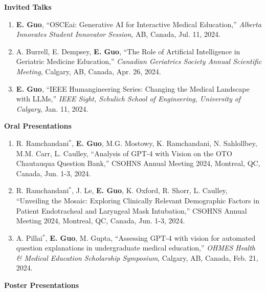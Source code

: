 \documentclass{article}
\begin{document}
\textbf{Invited Talks} \vspace{.5em}

\begin{enumerate}
    \item \textbf{E. Guo}, ``OSCEai: Generative AI for Interactive Medical Education,'' \textit{Alberta Innovates Student Innovator Session}, AB, Canada, Jul. 11, 2024.
    \item A. Burrell, E. Dempsey, \textbf{E. Guo}, ``The Role of Artificial Intelligence in Geriatric Medicine Education,'' \textit{Canadian Geriatrics Society Annual Scientific Meeting}, Calgary, AB, Canada, Apr. 26, 2024.
    \item \textbf{E. Guo}, ``IEEE Humangineering Series: Changing the Medical Landscape with LLMs,'' \textit{IEEE Sight, Schulich School of Engineering, University of Calgary}, Jan. 11, 2024.
\end{enumerate} \vspace{1em}

\textbf{Oral Presentations} \vspace{.5em}

\begin{enumerate}
    \item R. Ramchandani$^*$, \textbf{E. Guo}, M.G. Mostowy, K. Ramchandani, N. Sahlollbey, M.M. Carr, L. Caulley, ``Analysis of GPT-4 with Vision on the OTO Chautauqua Question Bank,'' CSOHNS Annual Meeting 2024, Montreal, QC, Canada, Jun. 1-3, 2024.
    \item R. Ramchandani$^*$, J. Le, \textbf{E. Guo}, K. Oxford, R. Shorr, L. Caulley, ``Unveiling the Mosaic: Exploring Clinically Relevant Demographic Factors in Patient Endotracheal and Laryngeal Mask Intubation,'' CSOHNS Annual Meeting 2024, Montreal, QC, Canada, Jun. 1-3, 2024.
    \item A. Pillai$^*$, \textbf{E. Guo}, M. Gupta, ``Assessing GPT-4 with vision for automated question explanations in undergraduate medical education,'' \textit{OHMES Health \& Medical Education Scholarship Symposium}, Calgary, AB, Canada, Feb. 21, 2024.
\end{enumerate} \vspace{1em}

\textbf{Poster Presentations} \vspace{.5em}
\end{document}
